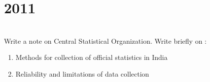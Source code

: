\section*{2011}
\vspace{-.5cm}
\hrulefill \smallskip\\
 Write a note on Central Statistical Organization.
\myline
{} Write briefly on :
\begin{enumerate}[topsep=0pt, itemsep = -1ex,label=(\roman*)]
    \item Methods for collection of official statistics in India
    \item Reliability and limitations of data collection
\end{enumerate}
